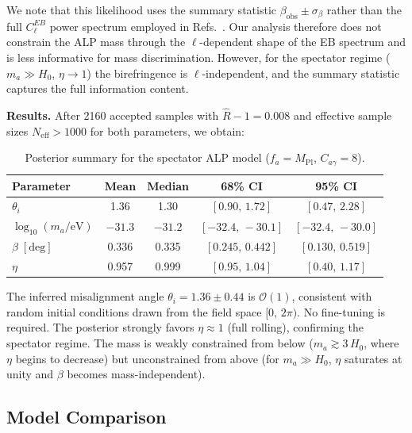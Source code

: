 We note that this likelihood uses the summary statistic $\beta_\mathrm{obs}
\pm \sigma_\beta$ rather than the full $C_\ell^{EB}$ power spectrum employed
in Refs.~\cite{Eskilt2023,Namikawa2025}.  Our analysis therefore does not
constrain the ALP mass through the $\ell$-dependent shape of the EB spectrum
and is less informative for mass discrimination.  However, for the spectator
regime ($m_a \gg H_0$, $\eta \to 1$) the birefringence is
$\ell$-independent, and the summary statistic captures the full information
content.

\medskip
\noindent\textbf{Results.}
After 2160 accepted samples with $\hat{R} - 1 = 0.008$ and effective sample
sizes $N_\mathrm{eff} > 1000$ for both parameters, we obtain:

\begin{table}[h]
\centering
\caption{Posterior summary for the spectator ALP model ($f_a = M_\mathrm{Pl}$,
  $C_{a\gamma} = 8$).}
\label{tab:mcmc}
\begin{tabular}{lcccc}
\hline\hline
Parameter & Mean & Median & 68\% CI & 95\% CI \\
\hline
$\theta_i$ & 1.36 & 1.30 & $[0.90,\, 1.72]$ & $[0.47,\, 2.28]$ \\
$\log_{10}(m_a/\mathrm{eV})$ & $-31.3$ & $-31.2$ & $[-32.4,\, -30.1]$ & $[-32.4,\, -30.0]$ \\
$\beta\;[\mathrm{deg}]$ & 0.336 & 0.335 & $[0.245,\, 0.442]$ & $[0.130,\, 0.519]$ \\
$\eta$ & 0.957 & 0.999 & $[0.95,\, 1.04]$ & $[0.40,\, 1.17]$ \\
\hline\hline
\end{tabular}
\end{table}

\noindent The inferred misalignment angle $\theta_i = 1.36 \pm 0.44$ is
$\mathcal{O}(1)$, consistent with random initial conditions drawn from the
field space $[0,\,2\pi)$.  No fine-tuning is required.  The posterior strongly
favors $\eta \approx 1$ (full rolling), confirming the spectator regime.  The
mass is weakly constrained from below ($m_a \gtrsim 3\,H_0$, where $\eta$
begins to decrease) but unconstrained from above (for $m_a \gg H_0$, $\eta$
saturates at unity and $\beta$ becomes mass-independent).


\subsection{Model Comparison}
\label{sec:model_comparison}

